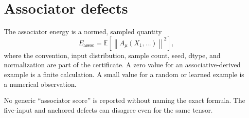 \section{Associator defects}

The associator energy is a normed, sampled quantity
\[
E_{\mathrm{assoc}}=\mathbb E\left[\left\lVert A_\mu(X_1,\ldots)\right\rVert^2\right],
\]
where the convention, input distribution, sample count, seed, dtype, and normalization are part of the certificate. A zero value for an associative-derived example is a finite calculation. A small value for a random or learned example is a numerical observation.

\begin{remark}
No generic ``associator score'' is reported without naming the exact formula. The five-input and anchored defects can disagree even for the same tensor.
\end{remark}

